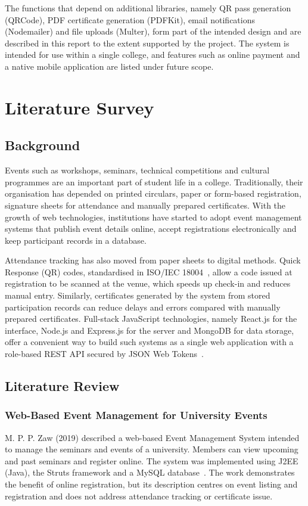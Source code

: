 \documentclass[12pt,a4paper]{report}
\begin{document}
The functions that depend on additional libraries, namely QR pass generation (QRCode), PDF certificate generation (PDFKit), email notifications (Nodemailer) and file uploads (Multer), form part of the intended design and are described in this report to the extent supported by the project. The system is intended for use within a single college, and features such as online payment and a native mobile application are listed under future scope.

\chapter{Literature Survey}

\section{Background}
Events such as workshops, seminars, technical competitions and cultural programmes are an important part of student life in a college. Traditionally, their organisation has depended on printed circulars, paper or form-based registration, signature sheets for attendance and manually prepared certificates. With the growth of web technologies, institutions have started to adopt event management systems that publish event details online, accept registrations electronically and keep participant records in a database.

Attendance tracking has also moved from paper sheets to digital methods. Quick Response (QR) codes, standardised in ISO/IEC 18004~\cite{iso18004}, allow a code issued at registration to be scanned at the venue, which speeds up check-in and reduces manual entry. Similarly, certificates generated by the system from stored participation records can reduce delays and errors compared with manually prepared certificates. Full-stack JavaScript technologies, namely React.js for the interface, Node.js and Express.js for the server and MongoDB for data storage, offer a convenient way to build such systems as a single web application with a role-based REST API secured by JSON Web Tokens~\cite{rfc7519}.

\section{Literature Review}

\subsection{Web-Based Event Management for University Events}
M. P. P. Zaw (2019) described a web-based Event Management System intended to manage the seminars and events of a university. Members can view upcoming and past seminars and register online. The system was implemented using J2EE (Java), the Struts framework and a MySQL database~\cite{zaw}. The work demonstrates the benefit of online registration, but its description centres on event listing and registration and does not address attendance tracking or certificate issue.
\end{document}
